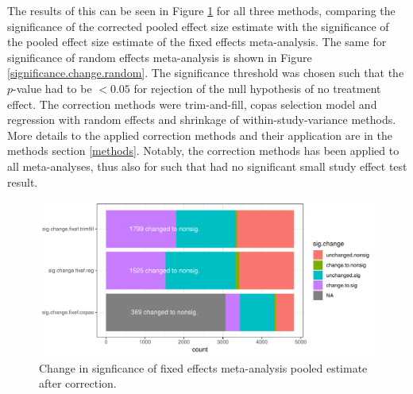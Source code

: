 \documentclass[11pt,a4paper,twoside]{book}\usepackage[]{graphicx}\usepackage[]{color}
\newenvironment{knitrout}{}{} %
\begin{document}
The results of this can be seen in Figure \ref{significance.change.fixed} for all three methods, comparing the significance of the corrected pooled effect size estimate with the significance of the pooled effect size estimate of the fixed effects meta-analysis. The same for significance of random effects meta-analysis is shown in Figure \ref{significance.change.random}. The significance threshold was chosen such that the $p$-value had to be $< 0.05$ for rejection of the null hypothesis of no treatment effect. The correction methods were trim-and-fill, copas selection model and regression with random effects and shrinkage of within-study-variance methods. More details to the applied correction methods and their application are in the methods section \ref{methods}. Notably, the correction methods has been applied to all meta-analyses, thus also for such that had no significant small study effect test result. 


\begin{figure}
\begin{knitrout}
\color{fgcolor}

{\centering \includegraphics[width=\textwidth-3cm]{figure/ch02_figunnamed-chunk-36-1} 

}



\end{knitrout}
\caption{Change in signficance of fixed effects meta-analysis pooled estimate after correction.}
\label{significance.change.fixed}
\end{figure}
\end{document}
